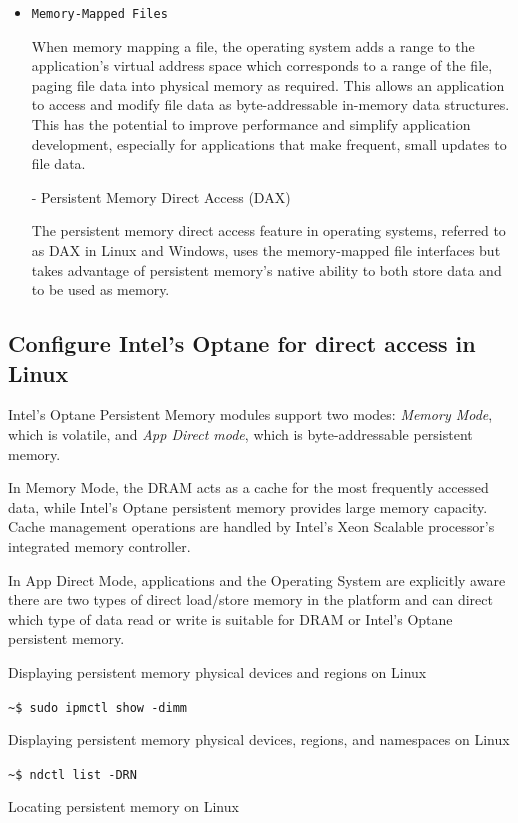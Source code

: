 \documentclass[11pt,swedish, openany, oneside]{book}
\begin{document}
\begin{itemize}
    \item \texttt{Memory-Mapped Files}

    When memory mapping a file, the operating system adds a range to the application's virtual address space which corresponds to a range of the file, paging file data into physical memory as required. This allows an application to access and modify file data as byte-addressable in-memory data structures. This has the potential to improve performance and simplify application development, especially for applications that make frequent, small updates to file data.

        - Persistent Memory Direct Access (DAX)
    
            The persistent memory direct access feature in operating systems, referred to as DAX in Linux and Windows, uses the memory-mapped file interfaces but takes advantage of persistent memory’s native ability to both store data and to be used as memory.\cite{Scargall2020}

\end{itemize}

\subsection{Configure Intel's Optane for direct access in Linux}
Intel's Optane Persistent Memory modules support two modes: \textit{Memory Mode}, which is volatile, and \textit{App Direct mode}, which is byte-addressable persistent memory.

In Memory Mode, the DRAM acts as a cache for the most frequently accessed data, while Intel's Optane persistent memory provides large memory capacity. Cache management operations are handled by Intel's Xeon Scalable processor's integrated memory controller.

In App Direct Mode, applications and the Operating System are explicitly aware there are two types of direct load/store memory in the platform and can direct which type of data read or write is suitable for DRAM or Intel's Optane persistent memory.\cite{startguide}

\noindent Displaying persistent memory physical devices and regions on Linux

\verb|~$ sudo ipmctl show -dimm|

\noindent Displaying persistent memory physical devices, regions, and namespaces on Linux

\verb|~$ ndctl list -DRN|

\noindent Locating persistent memory on Linux
\end{document}
